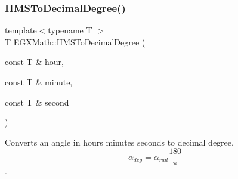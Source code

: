 \mbox{\label{group___e_g_x_math-_angle_conversions-_h_m_s_gacc6ae7123e7e54ddf8538cd6ab0198ce}} 
\subsubsection{\texorpdfstring{H\+M\+S\+To\+Decimal\+Degree()}{HMSToDecimalDegree()}}
{\footnotesize\ttfamily template$<$typename T $>$ \\
T E\+G\+X\+Math\+::\+H\+M\+S\+To\+Decimal\+Degree (\begin{DoxyParamCaption}\item[{const T \&}]{hour,  }\item[{const T \&}]{minute,  }\item[{const T \&}]{second }\end{DoxyParamCaption})}



Converts an angle in hours minutes seconds to decimal degree. \[\alpha_{deg}=\alpha_{rad}\frac{180}{\pi}\]. 

